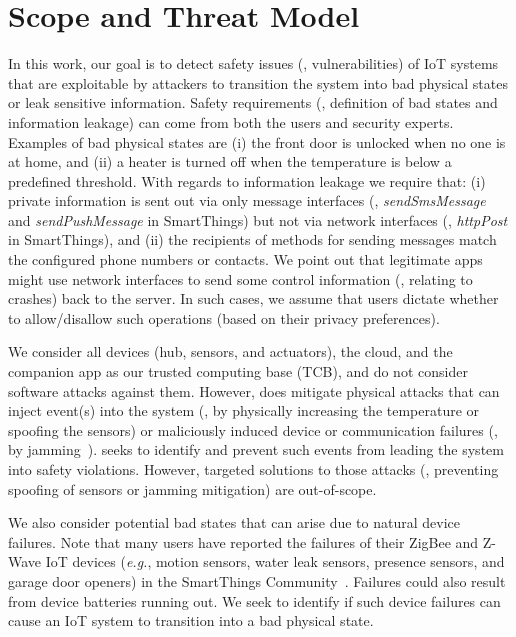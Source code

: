\chapter{Scope and Threat Model}
In this work, our goal is to detect safety issues (\ie, vulnerabilities) of IoT systems
that are exploitable by attackers to transition the system 
into bad physical states or leak sensitive information.
Safety requirements (\ie, definition of bad states and information leakage)
can come from both the users and security experts.
Examples of bad physical states are
(i) the front door is unlocked when no one is at home,
and (ii) a heater is turned off when the temperature is
{\color{black}below a predefined threshold}.
{\color{black} With regards to information leakage we require that:
(i) private information is sent out via only message interfaces
(\eg, \textit{sendSmsMessage} and \textit{sendPushMessage} in SmartThings) but not
via network interfaces (\eg, \textit{httpPost} in SmartThings), and
(ii) the recipients of methods for sending messages match the configured phone numbers or contacts.
We point out that legitimate apps might use network interfaces to
send some control information (\eg, relating to crashes) back to the server.}
In such cases, we assume that users dictate whether to allow/disallow such operations
(based on their privacy preferences).

We consider all devices (hub, sensors, and actuators), the cloud, and the companion app
as our trusted computing base (TCB), and do not consider software attacks against them.
However, \sys does mitigate physical attacks that can inject event(s) into the system
(\eg, by physically increasing the temperature or spoofing the sensors)
or maliciously induced device or communication failures (\eg, by jamming~\cite{5473884}).
\sys seeks to identify and prevent such events from leading the system into safety violations.
However,  targeted solutions to those attacks
(\eg, preventing spoofing of sensors or jamming mitigation) are out-of-scope.

We also consider potential bad states that can arise
due to natural device failures.
Note that many users have reported the failures of their ZigBee and Z-Wave IoT devices
(\textit{e.g.}, motion sensors, water leak sensors, presence sensors, and garage door openers)
in the SmartThings Community~\cite{Samsung:smartthingscom1,Samsung:smartthingscom2, Samsung:smartthingscom3, Samsung:smartthingscom4}.
Failures could also result from device batteries running out.
We seek to identify if such device failures can cause an IoT system to transition
into a bad physical state.

